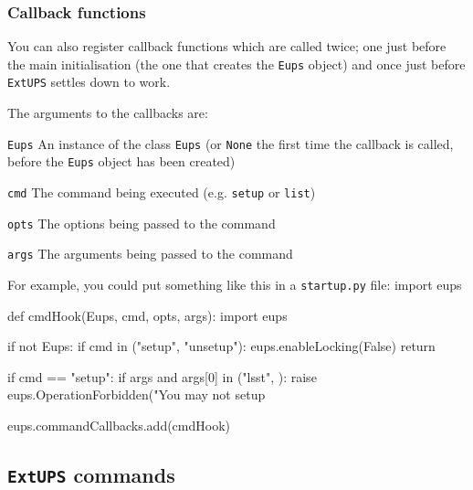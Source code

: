 \documentclass{article}
\newcommand{\code}[1]{\texttt{#1}}
\newcommand{\file}[1]{\texttt{#1}}
\newcommand{\eups}{\code{ExtUPS}}
\let\overbatim=\verbatim
\let\oendverbatim=\endverbatim
\renewenvironment{verbatim}
{\center\minipage{16cm}\overbatim}
{\oendverbatim\endminipage\endcenter}
\begin{document}
\subsubsection{Callback functions}
\label{commandCallbacks}

You can also register callback functions which are called twice; one just before the main initialisation (the
one that creates the \code{Eups} object) and once just before \eups{} settles down to work.

The arguments to the callbacks are:
\begin{description}
  \item \code{Eups}
    An instance of the class \code{Eups} (or \code{None} the first time the callback is called, before
    the \code{Eups} object has been created)

  \item \code{cmd}
    The command being executed (e.g. \code{setup} or \code{list})

  \item \code{opts}
    The options being passed to the command

  \item \code{args}
    The arguments being passed to the command
\end{description}

For example, you could put something like this in a \file{startup.py} file:
\begin{verbatim}
import eups

def cmdHook(Eups, cmd, opts, args):
    import eups

    if not Eups:
        if cmd in ("setup", "unsetup"):
            eups.enableLocking(False)
        return

    if cmd == "setup":
        if args and args[0] in ("lsst", ):
            raise eups.OperationForbidden("You may not setup %s because I say so" % args[0])

eups.commandCallbacks.add(cmdHook)
\end{verbatim}


\subsection{\eups{} commands}
\end{document}
